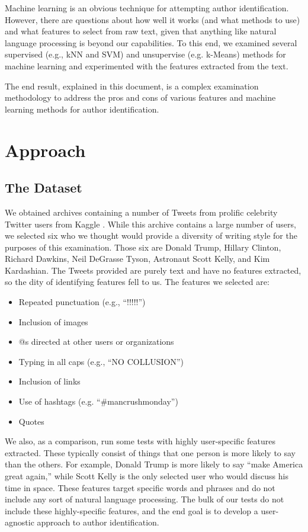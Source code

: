 \documentclass[letter,11pt,titlepage]{article}
\begin{document}
Machine learning is an obvious technique for attempting author identification. However, there are questions about how well it works (and what methods to use) and what features to select from raw text, given that anything like natural language processing is beyond our capabilities. To this end, we examined several supervised (e.g., kNN and SVM) and unsupervise (e.g. k-Means) methods for machine learning and experimented with the features extracted from the text.

The end result, explained in this document, is a complex examination methodology to address the pros and cons of various features and machine learning methods for author identification.

\section{Approach}

\subsection{The Dataset}

We obtained archives containing a number of Tweets from prolific celebrity Twitter users from Kaggle \cite{TweetSource}. While this archive contains a large number of users, we selected six who we thought would provide a diversity of writing style for the purposes of this examination. Those six are Donald Trump, Hillary Clinton, Richard Dawkins, Neil DeGrasse Tyson, Astronaut Scott Kelly, and Kim Kardashian. The Tweets provided are purely text and have no features extracted, so the dity of identifying features fell to us. The features we selected are:

\begin{itemize}
    \item Repeated punctuation (e.g., ``!!!!!'')
    \item Inclusion of images
    \item @s directed at other users or organizations
    \item Typing in all caps (e.g., ``NO COLLUSION'')
    \item Inclusion of links
    \item Use of hashtags (e.g. ``\#mancrushmonday'')
    \item Quotes
\end{itemize}

We also, as a comparison, run some tests with highly user-specific features extracted. These typically consist of things that one person is more likely to say than the others. For example, Donald Trump is more likely to say ``make America great again,'' while Scott Kelly is the only selected user who would discuss his time in space. These features target specific words and phrases and do not include any sort of natural language processing. The bulk of our tests do not include these highly-specific features, and the end goal is to develop a user-agnostic approach to author identification.
\end{document}
